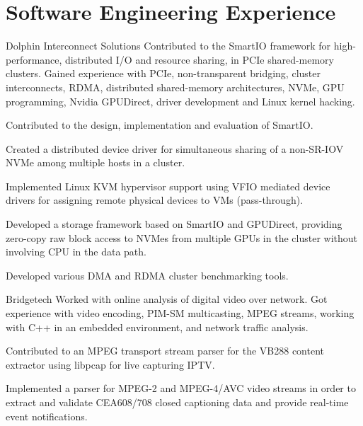 \section{Software Engineering Experience}
\begin{experience}{Dolphin Interconnect Solutions}{
}
Contributed to the SmartIO framework for high-performance, distributed I/O and resource sharing,
in PCIe shared-memory clusters. 
Gained experience with PCIe, non-transparent bridging, cluster interconnects, RDMA, distributed shared-memory
architectures, NVMe, GPU programming, Nvidia GPUDirect, driver development and Linux kernel hacking.

\begin{contribs}
	\item{Contributed to the design, implementation and evaluation of SmartIO.}
	\item{Created a distributed device driver for simultaneous sharing of a non-SR-IOV NVMe among multiple hosts in a cluster.}
	\item{Implemented Linux KVM hypervisor support using VFIO mediated device drivers
		for assigning remote physical devices to VMs (pass-through).}
	\item{Developed a storage framework based on SmartIO and GPUDirect, providing
		zero-copy raw block access to NVMes from multiple GPUs in the cluster without involving CPU in the data path.}
	\item{Developed various DMA and RDMA cluster benchmarking tools.}
\end{contribs}
\end{experience}

\begin{experience}{Bridgetech}{
}
Worked with online analysis of digital video over network.
Got experience with video encoding, PIM-SM multicasting, MPEG 
streams, working with C++ in an embedded environment, and
network traffic analysis.

\begin{contribs}
	\item{Contributed to an MPEG transport stream parser for the VB288 content extractor using libpcap for live capturing
		IPTV.}
	\item{Implemented a parser for MPEG-2 and MPEG-4/AVC video streams in order to extract and
		validate CEA608/708 closed captioning data and provide real-time event
		notifications.}
\end{contribs}
\end{experience}

